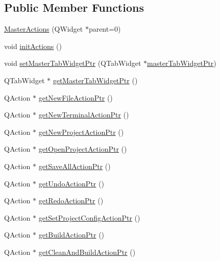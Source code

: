 \subsection*{Public Member Functions}
\begin{DoxyCompactItemize}
\item 
\hyperlink{class_master_actions_ad8eb348b90e75f5876c30692930a2c22}{Master\-Actions} (Q\-Widget $\ast$parent=0)
\item 
void \hyperlink{class_master_actions_a9e2ff3903452d1212d530e20af9d7936}{init\-Actions} ()
\item 
void \hyperlink{class_master_actions_aaa47a0a38ad7b5e95081417b129bbc63}{set\-Master\-Tab\-Widget\-Ptr} (Q\-Tab\-Widget $\ast$\hyperlink{class_master_actions_a774ef398053050c37d62b7a24e61c7ee}{master\-Tab\-Widget\-Ptr})
\item 
Q\-Tab\-Widget $\ast$ \hyperlink{class_master_actions_a10e5735225e146bd19d09f3fc1244a32}{get\-Master\-Tab\-Widget\-Ptr} ()
\item 
Q\-Action $\ast$ \hyperlink{class_master_actions_a0ef76147044b06c8b951534a0d7ab7f2}{get\-New\-File\-Action\-Ptr} ()
\item 
Q\-Action $\ast$ \hyperlink{class_master_actions_ae9f9f04302be1d7dc9fe902fc2597a1b}{get\-New\-Terminal\-Action\-Ptr} ()
\item 
Q\-Action $\ast$ \hyperlink{class_master_actions_a7065dfa244266181223b152795a996e9}{get\-New\-Project\-Action\-Ptr} ()
\item 
Q\-Action $\ast$ \hyperlink{class_master_actions_aac19d660169392d11b0ae1c2540cafb5}{get\-Open\-Project\-Action\-Ptr} ()
\item 
Q\-Action $\ast$ \hyperlink{class_master_actions_afd7ef11ff065232fca47f971af02c5e5}{get\-Save\-All\-Action\-Ptr} ()
\item 
Q\-Action $\ast$ \hyperlink{class_master_actions_aeb84d87b232944fc289dd0425c79e1a7}{get\-Undo\-Action\-Ptr} ()
\item 
Q\-Action $\ast$ \hyperlink{class_master_actions_ab2015974980e97a75d5d91037be9545b}{get\-Redo\-Action\-Ptr} ()
\item 
Q\-Action $\ast$ \hyperlink{class_master_actions_ad81b766a2f083ba53c529cd3f3582cd0}{get\-Set\-Project\-Config\-Action\-Ptr} ()
\item 
Q\-Action $\ast$ \hyperlink{class_master_actions_a2c89cb4aa70c13526d98e449a1e3a1b9}{get\-Build\-Action\-Ptr} ()
\item 
Q\-Action $\ast$ \hyperlink{class_master_actions_af23ec377bb3603963735d30876e6147e}{get\-Clean\-And\-Build\-Action\-Ptr} ()

\end{DoxyCompactItemize}
